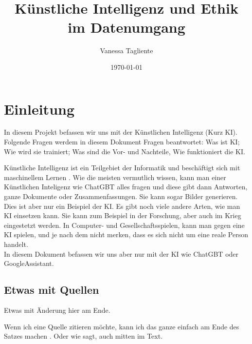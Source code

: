 \documentclass{report}
\title{Künstliche Intelligenz und Ethik im Datenumgang}
\author{Vanessa Tagliente}
\date{\today}
\begin{document}
\maketitle


\tableofcontents

\chapter{Einleitung}

In diesem Projekt befassen wir uns mit der Künstlichen Intelligenz (Kurz KI).
Folgende Fragen werdem in diesem Dokument Fragen beantwortet: Was ist KI; Wie wird sie trainiert; Was sind die Vor- und Nachteile, Wie funktioniert die KI.

\bigskip
Künstliche Intelligenz ist ein Teilgebiet der Informatik und beschäftigt sich mit maschinellem Lernen \citep{ai-wikipedia}.
Wie die meisten vermutlich wissen, kann man einer Künstlichen Inteligenz wie ChatGBT alles fragen und diese gibt dann Antworten, ganze Dokumente oder Zusammenfassungen. Sie kann sogar Bilder generieren.
Dies ist aber nur ein Beispiel der KI. Es gibt noch viele andere Arten, wie man KI einsetzen kann. Sie kann zum Beispiel in der Forschung, aber auch im Krieg eingestetzt werden. In Computer- und Gesellschaftsspielen, kann man gegen eine KI spielen, und je nach dem nicht merken, dass es sich nicht um eine reale Person handelt.\\
In diesem Dokument befassen wir uns aber nur mit der KI wie ChatGBT oder GoogleAssistant.









\section{Etwas mit Quellen}

Etwas mit Änderung hier am Ende.

Wenn ich eine Quelle zitieren möchte, kann ich das ganze einfach am Ende des Satzes machen \citep{example}. Oder wie \citet{example} sagt, auch mitten im Text.

\printbibliography
\end{document}
